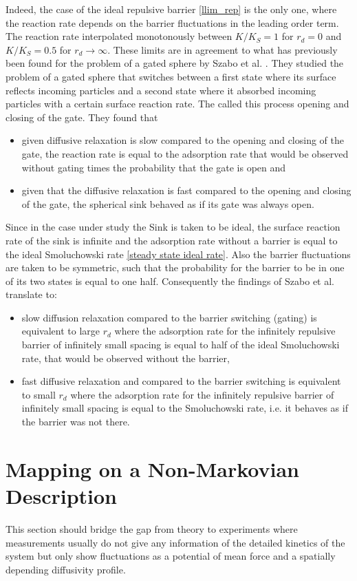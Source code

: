 Indeed, the case of the ideal repulsive barrier \eqref{llim_rep} is the only one, where the reaction rate depends on the barrier fluctuations in the leading order term. The reaction rate interpolated monotonously between $K/K_S = 1$ for $r_d = 0$ and $K/K_S = 0.5$ for $r_d \rightarrow \infty$. These limits are in agreement to what has previously been found for the problem of a gated sphere by Szabo et al. \cite{Szabo1982}. 
They studied the problem of a gated sphere that switches between a first state where its surface reflects incoming particles and a second state where it absorbed incoming particles with a certain surface reaction rate. The called this process opening and closing of the gate.
They found that 
\begin{itemize}
    \item given diffusive relaxation is slow compared to the opening and closing of the gate, the reaction rate is equal to the adsorption rate that would be observed without gating times the probability that the gate is open and
    \item given that the diffusive relaxation is fast compared to the opening and closing of the gate, the spherical sink behaved as if its gate was always open.
\end{itemize}
Since in the case under study the Sink is taken to be ideal, the surface reaction rate of the sink is infinite and the adsorption rate without a barrier is equal to the ideal Smoluchowski rate \eqref{steady state ideal rate}. Also the barrier fluctuations are taken to be symmetric, such that the probability for the barrier to be in one of its two states is equal to one half.
Consequently the findings of Szabo et al. translate to:
\begin{itemize}
    \item slow diffusion relaxation compared to the barrier switching (gating) is equivalent to large $r_d$ where the adsorption rate for the infinitely repulsive barrier of infinitely small spacing is equal to half of the ideal Smoluchowski rate, that would be observed without the barrier,
    \item fast diffusive relaxation and compared to the barrier switching is equivalent to small $r_d$ where the adsorption rate for the infinitely repulsive barrier of infinitely small spacing is equal to the Smoluchowski rate, i.e. it behaves as if the barrier was not there.
\end{itemize}


\newpage
\section{Mapping on a Non-Markovian Description}
This section should bridge the gap from theory to experiments where measurements usually do not give any information of the detailed kinetics of the system but only show fluctuations as a potential of mean force and a spatially depending diffusivity profile.

